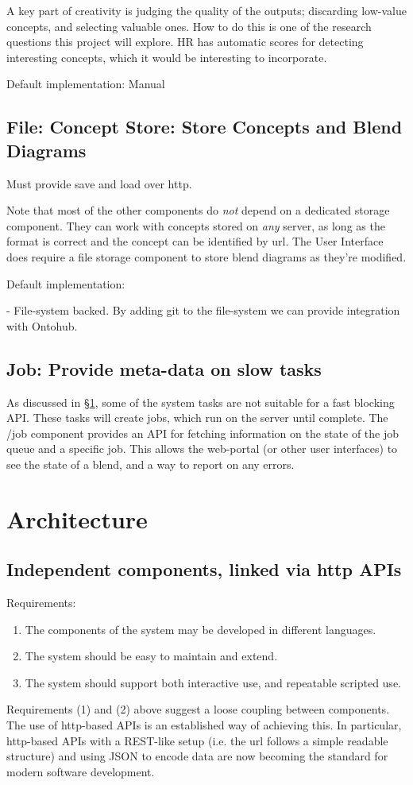 A key part of creativity is judging the quality of the outputs; discarding
low-value concepts, and selecting valuable ones. How to do this is one of the research questions this project will explore. HR has automatic scores for detecting interesting concepts, which it would be interesting to incorporate.

Default implementation: Manual

\subsection{File: Concept Store: Store Concepts and Blend Diagrams}


Must provide save and load over http.

Note that most of the other components do {\em not} depend on a dedicated storage component. They can work with concepts stored on {\em any} server, as long as the format is correct and the concept can be identified by url. The User Interface does require a file storage component to store blend diagrams as they're modified.

Default implementation: 

 - File-system backed. By adding git to the file-system we can provide integration with Ontohub.

\subsection{Job: Provide meta-data on slow tasks}


As discussed in \S\ref{sec:architecture}, some of the system tasks are not suitable for
a fast blocking API. These tasks will create jobs, which run on the server until complete.
The /job component provides an API for fetching information on the state of the job queue and a specific job. This allows the web-portal (or other user interfaces) to see the state of a blend, and a way to
report on any errors.

\section{Architecture}\label{sec:architecture}

\subsection{Independent components, linked via http APIs}

Requirements:  
\begin{enumerate}
\item The components of the system may be developed in different languages.
\item The system should be easy to maintain and extend.
\item The system should support both interactive use, and repeatable scripted use.
\end{enumerate}
Requirements (1) and (2) above suggest a loose coupling between components. The use of http-based APIs is an established way of achieving this. In particular, http-based APIs with a REST-like setup (i.e. the url follows a simple readable structure) and using JSON to encode data are now becoming the standard for modern software development. 

